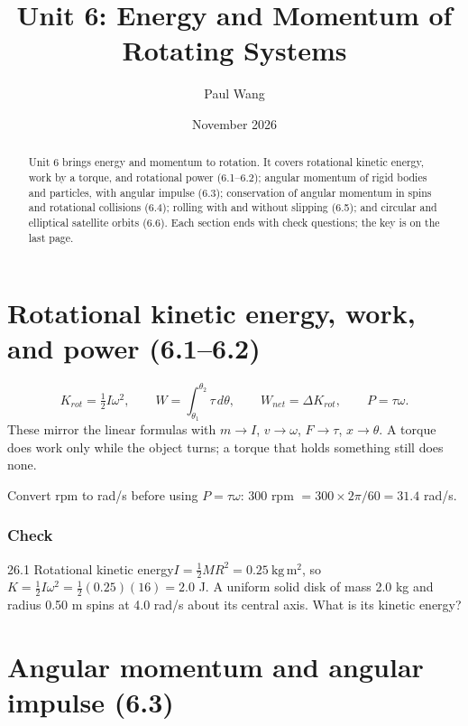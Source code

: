 \documentclass[11pt]{article}
\title{Unit 6: Energy and Momentum of Rotating Systems}
\author{Paul Wang}
\date{November 2026}
\begin{document}
\maketitle

\begin{abstract}
Unit 6 brings energy and momentum to rotation. It covers rotational kinetic energy, work by a torque, and rotational power (6.1--6.2); angular momentum of rigid bodies and particles, with angular impulse (6.3); conservation of angular momentum in spins and rotational collisions (6.4); rolling with and without slipping (6.5); and circular and elliptical satellite orbits (6.6). Each section ends with check questions; the key is on the last page.
\end{abstract}


\section{Rotational kinetic energy, work, and power (6.1--6.2)}\label{sec:1}

\[ K_{rot} = \tfrac12 I\omega^2, \qquad W = \int_{\theta_1}^{\theta_2}\tau\,d\theta, \qquad W_{net} = \Delta K_{rot}, \qquad P = \tau\omega. \]
These mirror the linear formulas with $m \to I$, $v \to \omega$, $F \to \tau$, $x \to \theta$. A torque does work only while the object turns; a torque that holds something still does none.
\begin{trap}
Convert rpm to rad/s before using $P = \tau\omega$: $300$ rpm $= 300 \times 2\pi/60 = 31.4$ rad/s.
\end{trap}

\subsubsection{Check}\mbox{}

\begin{q}{2}{6.1 Rotational kinetic energy}{$I = \tfrac12 MR^2 = 0.25\ \mathrm{kg\,m^2}$, so $K = \tfrac12 I\omega^2 = \tfrac12(0.25)(16) = 2.0$ J.}
A uniform solid disk of mass 2.0 kg and radius 0.50 m spins at 4.0 rad/s about its central axis. What is its kinetic energy?
\end{q}

\section{Angular momentum and angular impulse (6.3)}\label{sec:2}
\end{document}
